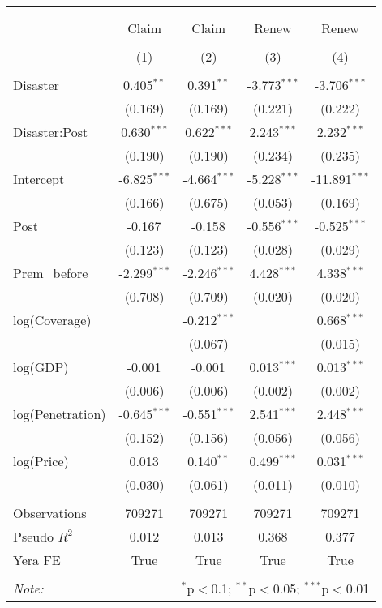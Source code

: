 
\begin{tabular}{@{\extracolsep{5pt}}lcccc}
\\[-1.8ex]\hline
\hline \\[-1.8ex]
\\[-1.8ex] & \multicolumn{1}{c}{Claim} & \multicolumn{1}{c}{Claim} & \multicolumn{1}{c}{Renew} & \multicolumn{1}{c}{Renew}  \\
\\[-1.8ex] & (1) & (2) & (3) & (4) \\
\hline \\[-1.8ex]
 Disaster & 0.405$^{**}$ & 0.391$^{**}$ & -3.773$^{***}$ & -3.706$^{***}$ \\
& (0.169) & (0.169) & (0.221) & (0.222) \\
 Disaster:Post & 0.630$^{***}$ & 0.622$^{***}$ & 2.243$^{***}$ & 2.232$^{***}$ \\
& (0.190) & (0.190) & (0.234) & (0.235) \\
 Intercept & -6.825$^{***}$ & -4.664$^{***}$ & -5.228$^{***}$ & -11.891$^{***}$ \\
& (0.166) & (0.675) & (0.053) & (0.169) \\
 Post & -0.167$^{}$ & -0.158$^{}$ & -0.556$^{***}$ & -0.525$^{***}$ \\
& (0.123) & (0.123) & (0.028) & (0.029) \\
 Prem\_before & -2.299$^{***}$ & -2.246$^{***}$ & 4.428$^{***}$ & 4.338$^{***}$ \\
& (0.708) & (0.709) & (0.020) & (0.020) \\
 log(Coverage) & & -0.212$^{***}$ & & 0.668$^{***}$ \\
& & (0.067) & & (0.015) \\
 log(GDP) & -0.001$^{}$ & -0.001$^{}$ & 0.013$^{***}$ & 0.013$^{***}$ \\
& (0.006) & (0.006) & (0.002) & (0.002) \\
 log(Penetration) & -0.645$^{***}$ & -0.551$^{***}$ & 2.541$^{***}$ & 2.448$^{***}$ \\
& (0.152) & (0.156) & (0.056) & (0.056) \\
 log(Price) & 0.013$^{}$ & 0.140$^{**}$ & 0.499$^{***}$ & 0.031$^{***}$ \\
& (0.030) & (0.061) & (0.011) & (0.010) \\
\hline \\[-1.8ex]
 Observations & 709271 & 709271 & 709271 & 709271 \\
 Pseudo $R^2$ & 0.012 & 0.013 & 0.368 & 0.377 \\
 Yera FE & True & True & True & True \\
\hline
\hline \\[-1.8ex]
\textit{Note:} & \multicolumn{4}{r}{$^{*}$p$<$0.1; $^{**}$p$<$0.05; $^{***}$p$<$0.01} \\
\end{tabular}
